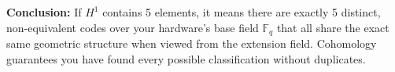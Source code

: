 \documentclass[11pt, a4paper, twoside]{article}
\newcommand{\F}{\mathbb{F}}
\begin{document}
	\textbf{Conclusion:} If $H^1$ contains 5 elements, it means there are exactly 5 distinct, non-equivalent codes over your hardware's base field $\F_q$ that all share the exact same geometric structure when viewed from the extension field. Cohomology guarantees you have found every possible classification without duplicates.
	
\end{document}
